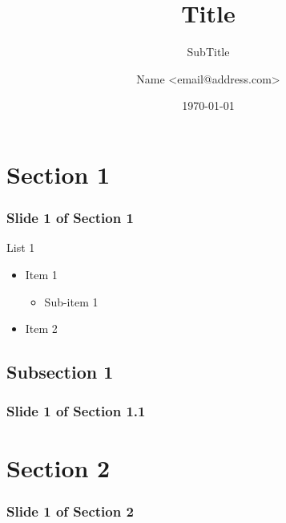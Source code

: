 \documentclass[t]{beamer}
\title{Title}
\subtitle{SubTitle}
\date{\today}
\author[LastName]{Name \textless email@address.com\textgreater}
\institute{Institution (Not Used)}
\begin{document}
\maketitle

\section{Section 1}

\begin{frame}
\frametitle{Slide 1 of Section 1}
List 1
  \begin{itemize}
    \item Item 1
      \begin{itemize}
        \item Sub-item 1
      \end{itemize}
    \item Item 2
  \end{itemize}
\end{frame}

\subsection{Subsection 1}

\begin{frame}
\frametitle{Slide 1 of Section 1.1}
\end{frame}

\section{Section 2}

\begin{frame}
\frametitle{Slide 1 of Section 2}
\end{frame}
\end{document}
